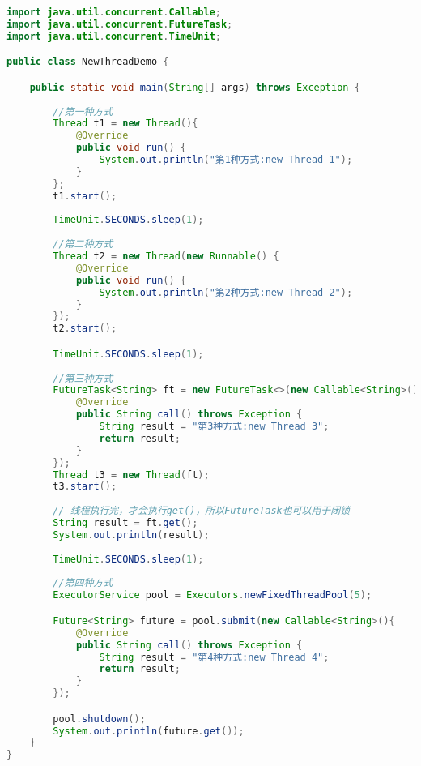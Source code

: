 \documentclass[../../../interview-questions.tex]{subfiles}
\begin{document}
\begin{lstlisting}[language=Java]
import java.util.concurrent.Callable;
import java.util.concurrent.FutureTask;
import java.util.concurrent.TimeUnit;

public class NewThreadDemo {

    public static void main(String[] args) throws Exception {
            
        //第一种方式
        Thread t1 = new Thread(){
            @Override
            public void run() {
                System.out.println("第1种方式:new Thread 1");
            }
        };
        t1.start();
        
        TimeUnit.SECONDS.sleep(1);
        
        //第二种方式
        Thread t2 = new Thread(new Runnable() {
            @Override
            public void run() {
                System.out.println("第2种方式:new Thread 2");
            }
        });
        t2.start();

        TimeUnit.SECONDS.sleep(1);
        
        //第三种方式
        FutureTask<String> ft = new FutureTask<>(new Callable<String>() {
            @Override
            public String call() throws Exception {
                String result = "第3种方式:new Thread 3";
                return result;
            }
        });
        Thread t3 = new Thread(ft);
        t3.start();
        
        // 线程执行完，才会执行get()，所以FutureTask也可以用于闭锁
        String result = ft.get();
        System.out.println(result);
        
        TimeUnit.SECONDS.sleep(1);
        
        //第四种方式
        ExecutorService pool = Executors.newFixedThreadPool(5);

        Future<String> future = pool.submit(new Callable<String>(){
            @Override
            public String call() throws Exception {
                String result = "第4种方式:new Thread 4";
                return result;
            }
        });

        pool.shutdown();
        System.out.println(future.get());
    }
}       
\end{lstlisting}
\end{document}
